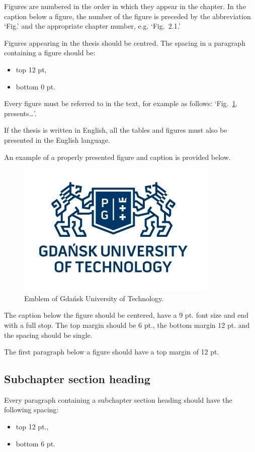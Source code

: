 Figures are numbered in the order in which they appear in the chapter. In the caption below a figure, the number of the figure is preceded by the abbreviation ‘Fig.’ and the appropriate chapter number, e.g. ‘Fig.~2.1.’

Figures appearing in the thesis should be centred. The spacing in a paragraph containing a figure should be:
\begin{itemize}
	\item top 12 pt,
	\item bottom 0 pt.
\end{itemize}

Every figure must be referred to in the text, for example as follows: `Fig.~\ref{fig:ETI-logo}. presents\ldots'. 

If the thesis is written in English, all the tables and figures must also be presented in the English language.

An example of a properly presented figure and caption is provided below.

\begin{figure}[h]
	\includegraphics{./img/LogoETI_en}
	\caption{Emblem of Gdańsk University of Technology.}
	\label{fig:ETI-logo}
\end{figure}

The caption below the figure should be centered, have a 9 pt. font size and end with a full stop. The top margin should be 6 pt., the bottom margin 12 pt. and the spacing should be single.

The first paragraph below a figure should have a top margin of 12 pt.



\subsection{Subchapter section heading}

Every paragraph containing a subchapter section heading should have the following spacing:
\begin{itemize}
	\item top 12 pt., 
	\item bottom 6 pt.
\end{itemize}



